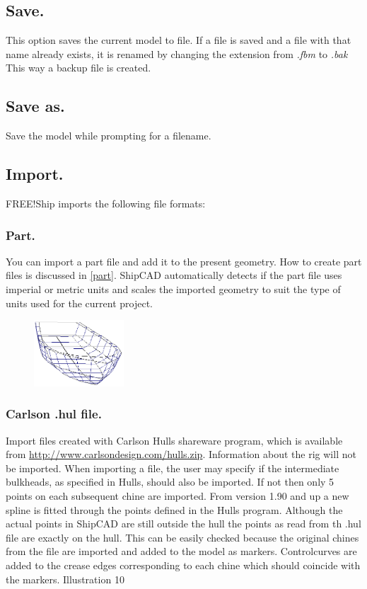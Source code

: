 \documentclass[12pt]{article}
\begin{document}
\subsection{Save.}
This option saves the current model to file. If a file is saved and a
file with that name already exists, it is renamed by changing the
extension from \textit{.fbm} to \textit{.bak} This way a backup file is created.

\subsection{Save as.}
Save the model while prompting for a filename.

\subsection{Import.}
FREE!Ship imports the following file formats:

\subsubsection{Part.}
You can import a part file and add it to the present geometry. How to
create part files is discussed in \ref{part}. ShipCAD automatically
detects if the part file uses imperial or metric units and scales the
imported geometry to suit the type of units used for the current
project.

\begin{figure}
        \centering
        \includegraphics[width=0.3\textwidth,natwidth=311,natheight=229]{filecarlson.png}
        \caption{}
        \label{fig:carlson}
\end{figure}

\subsubsection{Carlson .hul file.}
Import files created with Carlson Hulls shareware program, which is
available from
\url{http://www.carlsondesign.com/hulls.zip}. Information about the rig will not be imported. When
importing a file, the user may specify if the intermediate bulkheads, as specified in Hulls, should
also be imported. If not then only 5 points on each subsequent chine are imported. From version
1.90 and up a new spline is fitted through the points defined in
the Hulls program. Although the actual points in ShipCAD are
still outside the hull the points as read from th .hul file are
exactly on the hull. This can be easily checked because the
original chines from the file are imported and added to the
model as markers. Controlcurves are added to the crease
edges corresponding to each chine which should coincide with
the markers.
Illustration 10
\end{document}
